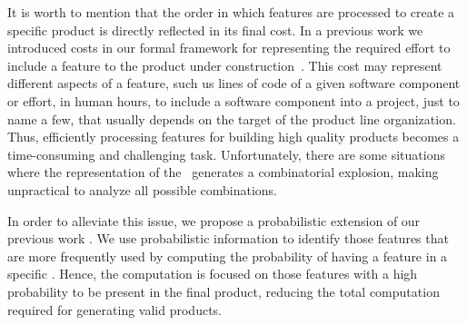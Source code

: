 It is worth to mention that the order in which features are processed to create a specific product is directly reflected in its final cost. In a previous work we introduced costs in our formal framework for representing the required effort to include a feature to the product under construction~\cite{clc16}. This cost may represent different aspects of a feature, such us lines of code of a given software component or effort, in human hours, to include a software component into a project, just to name a few, that usually depends on the target of the product line organization. Thus, efficiently processing features for building high quality products becomes a time-consuming and challenging task. Unfortunately, there are some situations where the representation of the \SPL\ generates a combinatorial explosion, making unpractical to analyze all possible combinations.


In order to alleviate this issue, we propose a probabilistic extension of our previous work \fodaPA. We use probabilistic information to identify those features that are more frequently used by computing the probability of having a feature in a specific \SPL. Hence, the computation is focused on those features with a high probability to be present in the final product, reducing the total computation required for generating valid products.

